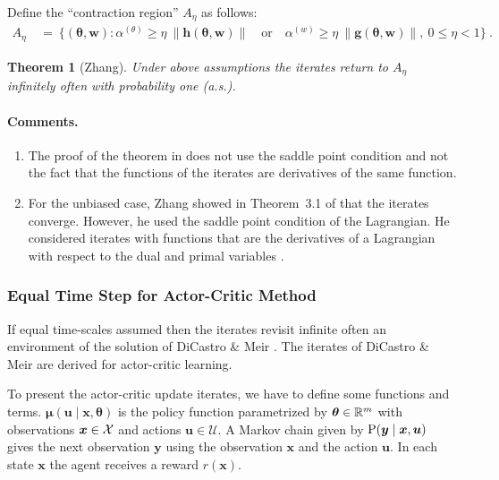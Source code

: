 \documentclass{article}
\newtheorem{theorem}{Theorem}
\newcommand\Bg{\bm{g}}
\newcommand\Bh{\bm{h}}
\newcommand\Bu{\bm{u}}
\newcommand\Bw{\bm{w}}
\newcommand\Bx{\bm{x}}
\newcommand\By{\bm{y}}
\newcommand\Bmu{\bm{\mu}}
\newcommand\Bth{\bm{\theta}}
\newcommand{\cU}{\mathcal{U}} \newcommand{\cV}{\mathcal{V}}
\renewcommand{\leq}{\leqslant}
\renewcommand{\geq}{\geqslant}
\begin{document}
Define the ``contraction region'' $A_{\eta}$ as follows:
\begin{align}
A_{\eta} \ &= \ \{(\Bth,\Bw): \alpha^{(\theta)} \geq \eta \
             \|\Bh(\Bth,\Bw)\| \quad \text{or} \quad  \alpha^{(w)} \geq \eta
             \ \|\Bg(\Bth,\Bw)\|, \ 0 \leq \eta < 1 \} \ .
\end{align}

\begin{theorem}[Zhang]
\label{th:Zhang}
Under above assumptions the iterates return to $A_{\eta}$
infinitely often with probability one (a.s.).
\end{theorem}


\paragraph{Comments.}
\begin{enumerate}[label=\textbf{(C\arabic*)}]
\item
The proof of the theorem in \cite{Zhang:07} does not use the
saddle point condition and not the fact that the functions of the
iterates are derivatives of the same function.

\item
For the unbiased case, Zhang showed in Theorem~3.1 of \cite{Zhang:07}
that the iterates converge.
However, he used the saddle point condition of the Lagrangian.
He considered
iterates with functions that are the derivatives of a Lagrangian
with respect to the dual
and primal variables \cite{Zhang:07}.

\end{enumerate}


\subsubsection{Equal Time Step for Actor-Critic Method}
If equal time-scales assumed then the iterates revisit infinite often
an environment of the solution of DiCastro \& Meir \cite{DiCastro:10}.
The iterates of DiCastro \& Meir are derived for actor-critic
learning.


To present the actor-critic update iterates,
we have to define some functions and terms.
$\Bmu(\Bu \mid \Bx, \Bth)$ is the policy function parametrized by
$\Bth \in \dR^m$ with observations $\Bx \in \cX$ and actions $\Bu \in \cU$.
A Markov chain given by $\rP(\By \mid \Bx, \Bu)$ gives the next
observation $\By$ using the observation $\Bx$ and the action $\Bu$.
In each state $\Bx$ the agent receives a reward $r(\Bx)$.
\end{document}
